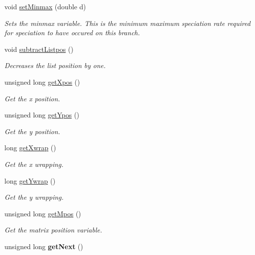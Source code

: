 \begin{DoxyCompactItemize}
void \hyperlink{class_datapoint_ae39f89adc38ffd3402d0f375d93e9362}{set\+Minmax} (double d)
\begin{DoxyCompactList}\small\item\em Sets the minmax variable. This is the minimum maximum speciation rate required for speciation to have occured on this branch. \end{DoxyCompactList}\item 
void \hyperlink{class_datapoint_a0c024dd886ef3c62ac732ceffd963f9f}{subtract\+Listpos} ()\hypertarget{class_datapoint_a0c024dd886ef3c62ac732ceffd963f9f}{}\label{class_datapoint_a0c024dd886ef3c62ac732ceffd963f9f}

\begin{DoxyCompactList}\small\item\em Decreases the list position by one. \end{DoxyCompactList}\item 
unsigned long \hyperlink{class_datapoint_a5306d840ce80a85bc490197dade66836}{get\+Xpos} ()
\begin{DoxyCompactList}\small\item\em Get the x position. \end{DoxyCompactList}\item 
unsigned long \hyperlink{class_datapoint_aea9d27e1580af67e8bccbcf50f1dfe71}{get\+Ypos} ()
\begin{DoxyCompactList}\small\item\em Get the y position. \end{DoxyCompactList}\item 
long \hyperlink{class_datapoint_a6470232aaebd69b3032a10c94f83eb7a}{get\+Xwrap} ()
\begin{DoxyCompactList}\small\item\em Get the x wrapping. \end{DoxyCompactList}\item 
long \hyperlink{class_datapoint_a662b95b7a5b1bbaa13163fbd36b81efd}{get\+Ywrap} ()
\begin{DoxyCompactList}\small\item\em Get the y wrapping. \end{DoxyCompactList}\item 
unsigned long \hyperlink{class_datapoint_a2fc40c16d1d4642e3de6ad9ea828d9e1}{get\+Mpos} ()
\begin{DoxyCompactList}\small\item\em Get the matrix position variable. \end{DoxyCompactList}\item 
unsigned long {\bfseries get\+Next} ()\hypertarget{class_datapoint_aeeeaebcc794466d066bafd2db7ef3f15}{}\label{class_datapoint_aeeeaebcc794466d066bafd2db7ef3f15}


\end{DoxyCompactItemize}
